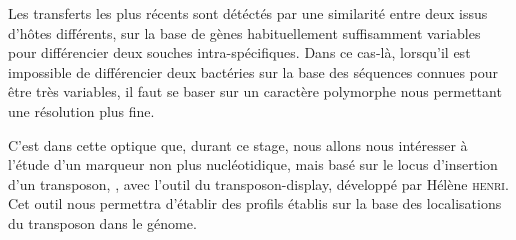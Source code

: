 Les transferts les plus récents sont détéctés par une similarité entre deux
 issus d'hôtes différents, sur la base de gènes habituellement
suffisamment variables pour différencier deux souches intra-spécifiques. Dans
ce cas-là, lorsqu'il est impossible de différencier deux bactéries sur la base
des séquences connues pour être très variables, il faut se baser sur un
caractère polymorphe nous permettant une résolution plus fine.

C'est dans cette optique que, durant ce stage, nous allons nous intéresser à
l'étude  d'un marqueur non plus nucléotidique, mais basé sur le locus
d'insertion d'un transposon, , avec l'outil du transposon-display,
développé par Hélène \textsc{henri}\cite{memHH}.  Cet outil nous permettra
d'établir des profils établis sur la base des localisations du transposon dans
le génome.
